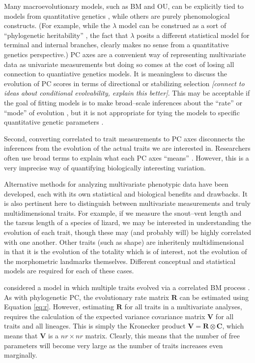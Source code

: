 \documentclass[a4paper,12pt]{article}
\begin{document}
Many macroevolutionary models, such as BM and OU, can be explicitly tied to models from quantitative genetics \citep{HansenMartins1996, PennellHarmon, PennellPE}, while others \citep[notably the tree transformations $\lambda, \delta, \kappa$ proposed by][]{Pagel1997, Pagel1999} are purely phenomological constructs. (For example, while the $\lambda$ model \citep{Pagel1999} can be construed as a sort of ``phylogenetic heritability'' \citep{HansenOrzack2005}, the fact that $\lambda$ posits a different statistical model for terminal and internal branches, clearly makes no sense from a quantitative genetics perspective.)  PC axes are a convenient way of representing multivariate data as univariate measurements but doing so comes at the cost of losing all connection to quantiative genetics models. It is meaningless to discuss the evolution of PC scores in terms of directional or stabilizing selection \emph{[connect to ideas about conditional evolvability, explain this better]}.  This may be acceptable if the goal of fitting models is to make broad--scale inferences about the ``rate'' or ``mode'' of evolution \citep{Hunt2012}, but it is not appropriate for tying the models to specific quantitative genetic parameters \citep[\emph{sensu}][]{EstesArnold2007, PennellPE}.

Second, converting correlated to trait measurements to PC axes disconnects the inferences from the evolution of the actual traits we are interested in. Researchers often use broad terms to explain what each PC axes ``means'' \citep[such as claiming PC1 represents ``size'' and PC1 represents ``shape''][]{Harmon2010, Price2014}. However, this is a very imprecise way of quantifying biologically interesting variation.

Alternative methods for analyzing multivariate phenotypic data have been developed, each with its own statistical and biological benefits and drawbacks. It is also pertinent here to distinguish between multivariate measurements and truly multidimensional traits. For example, if we measure the snout--vent length and the tarsus length of a species of lizard, we may be interested in understanding the evolution of each trait, though these may (and probably will) be highly correlated with one another. Other traits (such as shape) are inheritenly multidimensional in that it is the evolution of the totality which is of interest, not the evolution of the morphometric landmarks themselves. Different conceptual and statistical models are required for each of these cases.

 \citet{RevellHarmon} considered a model in which multiple traits evolved via a correlated BM process \citep[see also][]{Motmot}. As with phylogenetic PC, the evolutionary rate matrix $\mathbf{R}$ can be estimated using Equation \ref{eq:r}. However, estimating $\mathbf{R}$ for all traits in a multivariate analyses, requires the calculation of the expected variance covariance matrix $\mathbf{V}$ for all traits and all lineages. This is simply the Kronecker product $\mathbf{V} = \mathbf{R} \otimes \mathbf{C}$, which means that $\mathbf{V}$ is a $n r \times n  r$ matrix. Clearly, this means that the number of free parameters will become very large as the number of traits increases even marginally.
\end{document}

